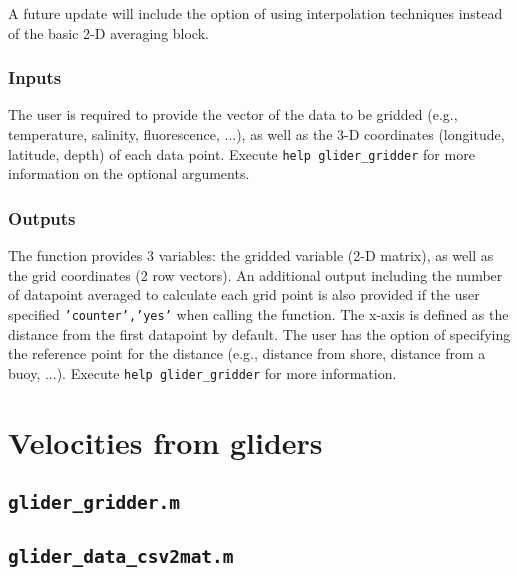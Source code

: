 \documentclass[11pt,A4]{report}
\begin{document}
A future update will include the option of using interpolation techniques instead of the basic 2-D averaging block.

\subsubsection{Inputs}

The user is required to provide the vector of the data to be gridded (e.g., temperature, salinity, fluorescence, ...), as well as the 3-D coordinates (longitude, latitude, depth) of each data point. Execute \texttt{help glider\_gridder} for more information on the optional arguments.

\subsubsection{Outputs}

The function provides 3 variables: the gridded variable (2-D matrix), as well as the grid coordinates (2 row vectors). An additional output including the number of datapoint averaged to calculate each grid point is also provided if the user specified \texttt{'counter','yes'} when calling the function.
The x-axis is defined as the distance from the first datapoint by default. The user has the option of specifying the reference point for the distance (e.g., distance from shore, distance from a buoy, ...). Execute \texttt{help glider\_gridder} for more information.

\section{Velocities from gliders}

\subsection{\texttt{glider\_gridder.m}}
\subsection{\texttt{glider\_data\_csv2mat.m}}

\pagebreak
%

\pagebreak


\end{document}
